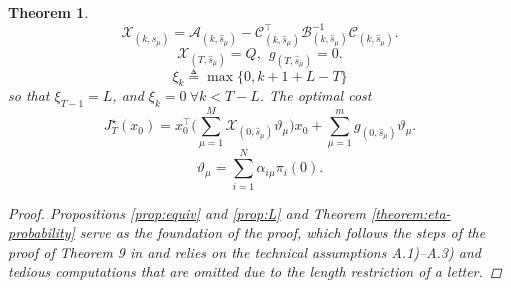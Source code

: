 \documentclass[journal,twoside,web]{ieeecolor}
\newtheorem{theorem}{Theorem}
\begin{document}
\begin{theorem}
\begin{equation}\label{eq:fh-x}
    \mathcal{X}_{(k,\hat{s}_{\mu})} = \mathcal{A}_{(k,\hat{s}_{\mu})} - \mathcal{C}_{(k,\hat{s}_{\mu})}^{\top} \mathcal{B}_{(k,\hat{s}_{\mu})}^{-1} \mathcal{C}_{(k,\hat{s}_{\mu})}.
\end{equation}    
\begin{equation}\label{eq:fh-x-g-t}
    \mathcal{X}_{(T,\hat{s}_{\mu})} = Q,~~
    g_{(T,\hat{s}_{\mu})} = 0. 
\end{equation}
\begin{equation}\label{eq:xik}
    \xi_k \triangleq \max \{0, k+1+L-T \}
\end{equation}
    so that $\xi_{T-1}=L$, and $\xi_{k} = 0~ \forall k<T-L$. The optimal cost %
\begin{equation}\label{eq:fh-cost}
   J_{T}^{\star}(x_0) = x_{0}^{\top}\bigg( \sum_{\mu=1}^{M}  \mathcal{X}_{(0,\hat{s}_{\mu})} \vartheta_{\mu} \bigg) x_{0} +
    \sum_{\mu=1}^{m} g_{(0,\hat{s}_{\mu})} \vartheta_{\mu}.
\end{equation}
\begin{equation}\label{eq:init-distrib-mu}
    \vartheta_{\mu} = \sum_{i=1}^{N} \alpha_{i\mu} \pi_{i}(0).
\end{equation}
\begin{proof}
Propositions \ref{prop:equiv} and \ref{prop:L} and Theorem \ref{theorem:eta-probability} serve as the foundation of the proof, which follows the steps of the proof of Theorem 9 in \cite{yZL-2025-automatica} and relies on the technical assumptions A.1)–A.3) and tedious computations that are omitted due to the length restriction of a letter.
\end{proof}
\end{theorem}
\end{document}
